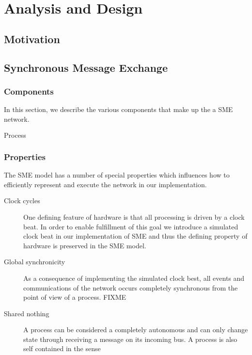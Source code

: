 \chapter{Analysis and Design}

\section{Motivation}

\section{Synchronous Message Exchange}

\subsection{Components}

In this section, we describe the various components that make up the
a SME network.

\begin{description}
  \item[Process] 
\end{description}

\subsection{Properties}
The SME model has a number of special properties which influences how
to efficiently represent and execute the network in our implementation.

\begin{description}

  \item[Clock cycles] One defining feature of
    hardware is that all processing is driven by a clock beat. In
    order to enable fulfillment of this goal we introduce a simulated
    clock beat in our implementation of SME and thus the defining
    property of hardware is preserved in the SME model.

  \item[Global synchronicity] As a consequence of implementing the
    simulated clock best, all events and communications of the
    network occurs completely synchronous from the point of view of a
    process. FIXME

  \item[Shared nothing] A process can be considered a completely
    autonomous and can only change state through receiving a message
    on its incoming bus. A process is also self contained in the sense
\end{description}

